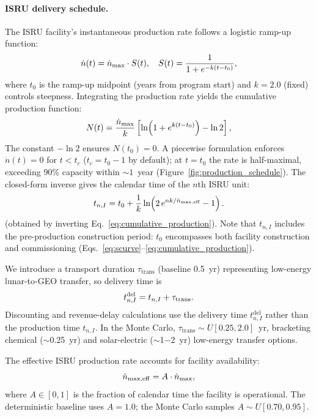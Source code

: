\documentclass[5p,twocolumn]{elsarticle}
\begin{document}
\paragraph{ISRU delivery schedule.} The ISRU facility's instantaneous production rate follows a logistic ramp-up function:
\begin{equation}\small
  \dot{n}(t) = \dot{n}_{\max} \cdot S(t), \quad S(t) = \frac{1}{1 + e^{-k(t - t_0)}},
  \label{eq:scurve}
\end{equation}
where $t_0$ is the ramp-up midpoint (years from program start) and $k = 2.0$ (fixed) controls steepness. Integrating the production rate yields the cumulative production function:
\begin{equation}\small
  N(t) = \frac{\dot{n}_{\max}}{k} \left[ \ln\!\left(1 + e^{k(t - t_0)}\right) - \ln 2 \right],
  \label{eq:cumulative_production}
\end{equation}
The constant $-\ln 2$ ensures $N(t_0) = 0$. A piecewise formulation enforces $\dot{n}(t) = 0$ for $t < t_c$ ($t_c = t_0 - 1$ by default); at $t = t_0$ the rate is half-maximal, exceeding 90\% capacity within ${\sim}1$~year (Figure~\ref{fig:production_schedule}). The closed-form inverse gives the calendar time of the $n$th ISRU unit:
\begin{equation}\small
  t_{n,I} = t_0 + \frac{1}{k} \ln\!\left(2\,e^{nk/\dot{n}_{\max,\mathrm{eff}}} - 1\right).
  \label{eq:production_schedule}
\end{equation}
(obtained by inverting Eq.~\ref{eq:cumulative_production}). Note that $t_{n,I}$ includes the pre-production construction period: $t_0$ encompasses both facility construction and commissioning (Eqs.~\ref{eq:scurve}--\ref{eq:cumulative_production}).

We introduce a transport duration $\tau_{\mathrm{trans}}$ (baseline 0.5~yr) representing low-energy lunar-to-GEO transfer, so delivery time is
\begin{equation}\small
  t_{n,I}^{\mathrm{del}} = t_{n,I} + \tau_{\mathrm{trans}}.
  \label{eq:delivery_time}
\end{equation}
Discounting and revenue-delay calculations use the delivery time $t_{n,I}^{\mathrm{del}}$ rather than the production time $t_{n,I}$. In the Monte Carlo, $\tau_{\mathrm{trans}} \sim U[0.25, 2.0]$~yr, bracketing chemical ($\sim$0.25~yr) and solar-electric ($\sim$1$-$2~yr) low-energy transfer options.

The effective ISRU production rate accounts for facility availability:
\begin{equation}\small
  \dot{n}_{\max,\mathrm{eff}} = A \cdot \dot{n}_{\max},
  \label{eq:availability}
\end{equation}
where $A \in [0,1]$ is the fraction of calendar time the facility is operational. The deterministic baseline uses $A = 1.0$; the Monte Carlo samples $A \sim U[0.70, 0.95]$.
\end{document}
